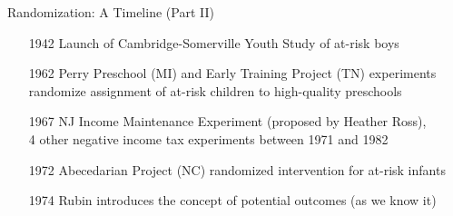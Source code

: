 \documentclass[10pt,xcolor=table,ignorenonframetext,handout,aspectratio=169]{beamer}
\newlength{\wideitemsep}
\let\olditem\item
\renewcommand{\item}{\setlength{\itemsep}{\wideitemsep}\olditem}
\begin{document}

\begin{frame}{Randomization:  A Timeline (Part II)}

\medskip
\begin{small}
	\begin{itemize}
		
		
		
		\item[1942] Launch of Cambridge-Somerville Youth Study of at-risk boys
		
		
		\item[1962] Perry Preschool (MI) and Early Training Project (TN) experiments randomize assignment of at-risk children to high-quality preschools 
		
		\item[1967] NJ Income Maintenance Experiment (proposed by Heather Ross), \\
		4 other negative income tax experiments between 1971 and 1982
		
		\item[1972] Abecedarian Project (NC) randomized intervention for at-risk infants 
		
		\item[1974] Rubin introduces the concept of potential outcomes (as we know it)
		

\end{itemize}
\end{small}
\end{frame}
\end{document}
